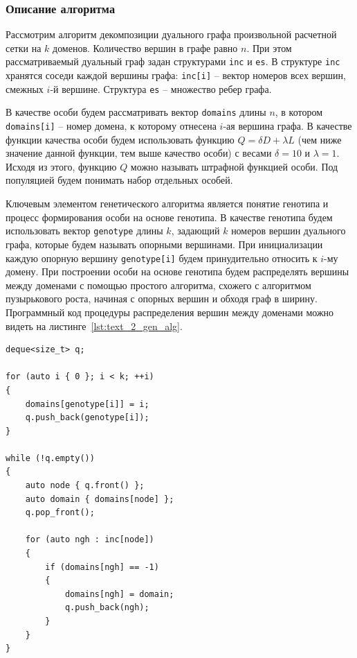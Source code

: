 \subsubsection{Описание алгоритма}

Рассмотрим алгоритм декомпозиции дуального графа\label{term:dual_graph2} произвольной расчетной сетки на $k$ доменов.
Количество вершин в графе равно $n$.
При этом рассматриваемый дуальный граф задан структурами \texttt{inc} и \texttt{es}.
В структуре \texttt{inc} хранятся соседи каждой вершины графа: \texttt{inc[i]} -- вектор номеров всех вершин, смежных $i$-й вершине.
Структура \texttt{es} -- множество ребер графа.

В качестве особи будем рассматривать вектор \texttt{domains} длины $n$, в котором \texttt{domains[i]} -- номер домена\label{term:domain4}, к которому отнесена $i$-ая вершина графа.
В качестве функции качества особи будем использовать функцию $Q = \delta D + \lambda L$ (чем ниже значение данной функции, тем выше качество особи) с весами $\delta = 10$ и $\lambda = 1$.
Исходя из этого, функцию $Q$ можно называть штрафной функцией особи.
Под популяцией будем понимать набор отдельных особей.

Ключевым элементом генетического алгоритма является понятие генотипа и процесс формирования особи на основе генотипа.
В качестве генотипа будем использовать вектор \texttt{genotype} длины $k$, задающий $k$ номеров вершин дуального графа, которые будем называть опорными вершинами\label{term:opor_point}.
При инициализации каждую опорную вершину \texttt{genotype[i]} будем принудительно относить к $i$-му домену.
При построении особи на основе генотипа будем распределять вершины между доменами с помощью простого алгоритма, схожего с алгоритмом пузырькового роста, начиная с опорных вершин и обходя граф в ширину.
Программный код процедуры распределения вершин между доменами можно видеть на листинге~\ref{lst:text_2_gen_alg}.

\begin{singlespace}
\begin{lstlisting}[caption={Простая декомпозиция, используемая в генетическом алгоритме.},label={lst:text_2_gen_alg}]
deque<size_t> q;

for (auto i { 0 }; i < k; ++i)
{
    domains[genotype[i]] = i;
    q.push_back(genotype[i]);
}

while (!q.empty())
{
    auto node { q.front() };
    auto domain { domains[node] };
    q.pop_front();

    for (auto ngh : inc[node])
    {
        if (domains[ngh] == -1)
        {
            domains[ngh] = domain;
            q.push_back(ngh);
        }
    }
}
\end{lstlisting}
\end{singlespace}

